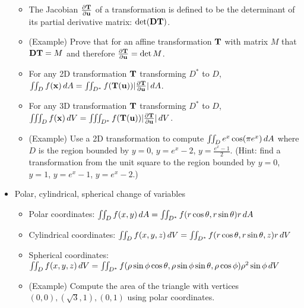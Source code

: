 \documentclass[11pt]{article}
\begin{document}
\begin{itemize}
\begin{itemize}
      \item The Jacobian \(\frac{\partial \mathbf{T}}{\partial \mathbf{u}}\) of a transformation
            is defined to be the determinant of its partial derivative matrix:
            \(\det(\mathbf{D}\mathbf{T})\).
      \item (Example) Prove that for an affine transformation \(\mathbf{T}\) with
            matrix \(M\) that \(\mathbf{D}\mathbf{T}=M\) and therefore
            \(\frac{\partial\mathbf{T}}{\partial\mathbf{u}}=\det M\).
      \item For any 2D transformation \(\mathbf{T}\)
            transforming \(D^*\) to \(D\),
            \(
              \iint_D f(\mathbf{x})\,d A
                =
              \iint_{D^*}f(\mathbf{T}(\mathbf{u}))|\frac{\partial\mathbf{T}}{\partial\mathbf{u}}|\,d A
            \).
      \item For any 3D transformation \(\mathbf{T}\)
            transforming \(D^*\) to \(D\),
            \(
              \iiint_D f(\mathbf{x})\,d V
                =
              \iiint_{D^*}f(\mathbf{T}(\mathbf{u}))|\frac{\partial\mathbf{T}}{\partial\mathbf{u}}|\,d V
            \).
      \item (Example) Use a 2D transformation to compute
            \(\iint_D e^x\cos(\pi e^x)\,d{A}\) where
            \(D\) is the region
            bounded by \(y=0\), \(y=e^x-2\), \(y=\frac{e^x-1}{2}\).
            (Hint: find a transformation from the unit square to the
            region bounded by \(y=0\),
            \(y=1\), \(y=e^x-1\), \(y=e^x-2\).)
    \end{itemize}
  \item Polar, cylindrical, spherical change of variables
    \begin{itemize}
      \item Polar coordinates:
            \(
              \iint_D f(x,y)\,d A
                =
              \iint_{D^*}f(r\cos\theta,r\sin\theta)r\,d A
            \)
      \item Cylindrical coordinates:
            \(
              \iint_D f(x,y,z)\,d V
                =
              \iint_{D^*}f(r\cos\theta,r\sin\theta,z)r\,d V
            \)
      \item Spherical coordinates:
            \(
              \iint_D f(x,y,z)\,d V
                =
              \iint_{D^*} f(
                \rho\sin\phi\cos\theta,
                \rho\sin\phi\sin\theta,
                \rho\cos\phi
              )\rho^2\sin\phi\,d V
            \)
      \item (Example) Compute the area of the triangle with vertices
            \((0,0),(\sqrt 3,1),(0,1)\) using polar coordinates.

\end{itemize}
\end{itemize}
\end{document}
